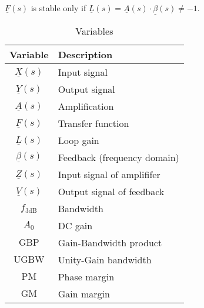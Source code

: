 \documentclass{article}[11pt]
\begin{document}
$\underline{F}(s)$ is stable only if 
$\underline{L}(s) = \underline{A}(s) \cdot \underline{\beta}(s) \neq -1$.


\begin{table}[H]
\centering
\caption{Variables}
\begin{tabular}{cl}
\toprule
\textbf{Variable}       & \textbf{Description}        \\ \midrule
$\underline{X}(s)$      & Input signal                \\ 
$\underline{Y}(s)$      & Output signal               \\
$\underline{A}(s)$      & Amplification               \\
$\underline{F}(s)$      & Transfer function           \\
$\underline{L}(s)$      & Loop gain                   \\
$\underline{\beta}(s)$  & Feedback (frequency domain) \\
$\underline{Z}(s)$      & Input signal of amplififer  \\
$\underline{V}(s)$      & Output signal of feedback   \\
$f_{\mathrm{3dB}}$      & Bandwidth                   \\
$A_{\mathrm{0}}$        & DC gain                     \\
$\mathrm{GBP}$          & Gain-Bandwidth product      \\
$\mathrm{UGBW}$         & Unity-Gain bandwidth        \\
$\mathrm{PM}$           & Phase margin                \\
$\mathrm{GM}$           & Gain margin                 \\ \toprule
\end{tabular}
\label{tab:variables}
\end{table}
\end{document}
